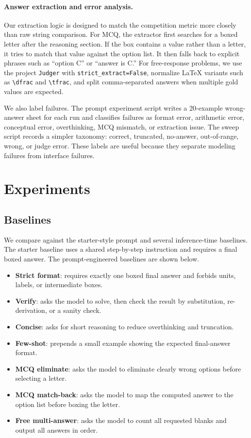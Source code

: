 \documentclass{article}
\begin{document}
\paragraph{Answer extraction and error analysis.}
Our extraction logic is designed to match the competition metric more closely than raw string comparison. For MCQ, the extractor first searches for a boxed letter after the reasoning section. If the box contains a value rather than a letter, it tries to match that value against the option list. It then falls back to explicit phrases such as ``option C'' or ``answer is C.'' For free-response problems, we use the project \texttt{Judger} with \texttt{strict\_extract=False}, normalize LaTeX variants such as \verb|\dfrac| and \verb|\tfrac|, and split comma-separated answers when multiple gold values are expected.

We also label failures. The prompt experiment script writes a 20-example wrong-answer sheet for each run and classifies failures as format error, arithmetic error, conceptual error, overthinking, MCQ mismatch, or extraction issue. The sweep script records a simpler taxonomy: correct, truncated, no-answer, out-of-range, wrong, or judge error. These labels are useful because they separate modeling failures from interface failures.

\section{Experiments}
\label{sec:experiments}

\subsection{Baselines}
\label{sec:baselines}

We compare against the starter-style prompt and several inference-time baselines. The starter baseline uses a shared step-by-step instruction and requires a final boxed answer. The prompt-engineered baselines are shown below.
\begin{itemize}
  \item \textbf{Strict format}: requires exactly one boxed final answer and forbids units, labels, or intermediate boxes.
  \item \textbf{Verify}: asks the model to solve, then check the result by substitution, re-derivation, or a sanity check.
  \item \textbf{Concise}: asks for short reasoning to reduce overthinking and truncation.
  \item \textbf{Few-shot}: prepends a small example showing the expected final-answer format.
  \item \textbf{MCQ eliminate}: asks the model to eliminate clearly wrong options before selecting a letter.
  \item \textbf{MCQ match-back}: asks the model to map the computed answer to the option list before boxing the letter.
  \item \textbf{Free multi-answer}: asks the model to count all requested blanks and output all answers in order.
\end{itemize}
\end{document}
